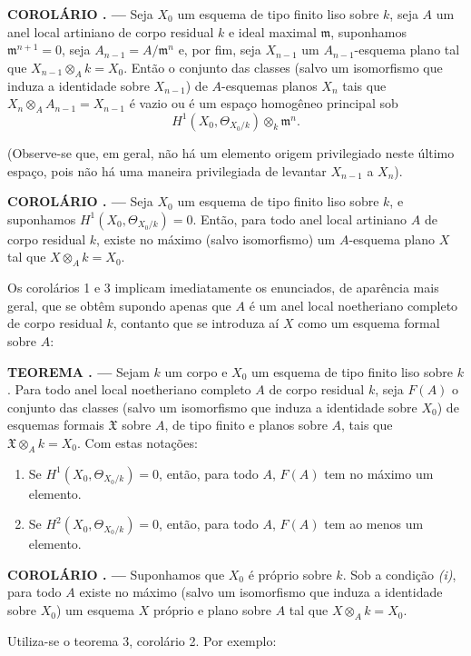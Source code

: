 \documentclass[11pt,twoside,openany]{book}
\numberwithin{equation}{section}
\newcommand{\src}[1]{%
  \phantomsection\hypertarget{src:#1}{}%
  \marginpar{\raggedleft\footnotesize\sffamily #1}%
}
\theoremstyle{plain}
\theoremstyle{definition}
\theoremstyle{remark}
\newcommand{\result}[2]{%
  \par\medskip\noindent\textbf{#1%
  \if\relax\detokenize{#2}\relax\else\space#2\fi. ---}\enspace
}
\newcommand{\FgaUnitKey}{frontmatter}
\renewcommand{\src}[1]{%
  \phantomsection\hypertarget{src:\FgaUnitKey:#1}{}%
  \marginpar{\raggedleft\footnotesize\sffamily #1}%
}
\begin{document}
\src{205}
\result{COROLÁRIO}{2} Seja $X_0$ um esquema de tipo finito liso sobre $k$, seja
$A$ um anel local artiniano de corpo residual $k$ e ideal maximal
$\mathfrak m$, suponhamos $\mathfrak m^{n+1}=0$, seja
$A_{n-1}=A/\mathfrak m^n$ e, por fim, seja $X_{n-1}$ um
$A_{n-1}$-esquema plano tal que $X_{n-1}\otimes_A k=X_0$. Então o conjunto
das classes (salvo um isomorfismo que induza a identidade sobre $X_{n-1}$)
de $A$-esquemas planos $X_n$ tais que
$X_n\otimes_A A_{n-1}=X_{n-1}$ é vazio ou é um espaço homogêneo principal
sob
\[
  H^1(X_0,\Theta_{X_0/k})\otimes_k\mathfrak m^n.
\]

(Observe-se que, em geral, não há um elemento origem privilegiado neste
último espaço, pois não há uma maneira privilegiada de levantar $X_{n-1}$ a
$X_n$).

\result{COROLÁRIO}{3} Seja $X_0$ um esquema de tipo finito liso sobre $k$, e
suponhamos $H^1(X_0,\Theta_{X_0/k})=0$. Então, para todo anel local
artiniano $A$ de corpo residual $k$, existe no máximo (salvo isomorfismo) um
$A$-esquema plano $X$ tal que $X\otimes_A k=X_0$.

Os corolários 1 e 3 implicam imediatamente os enunciados, de aparência mais
geral, que se obtêm supondo apenas que $A$ é um anel local
noetheriano completo de corpo residual $k$, contanto que se introduza aí $X$
como um esquema formal sobre $A$:

\result{TEOREMA}{9} Sejam $k$ um corpo e $X_0$ um esquema de tipo finito liso
sobre $k$. Para todo anel local noetheriano completo $A$ de corpo residual
$k$, seja $F(A)$ o conjunto das classes (salvo um isomorfismo que induza a
identidade sobre $X_0$) de esquemas formais $\mathfrak X$ sobre $A$, de tipo
finito e planos sobre $A$, tais que $\mathfrak X\otimes_A k=X_0$. Com estas
notações:
\begin{enumerate}
  \item[\textit{i.}] Se $H^1(X_0,\Theta_{X_0/k})=0$, então, para todo $A$,
    $F(A)$ tem no máximo um elemento.
  \item[\textit{ii.}] Se $H^2(X_0,\Theta_{X_0/k})=0$, então, para todo $A$,
    $F(A)$ tem ao menos um elemento.
\end{enumerate}

\src{206}
\result{COROLÁRIO}{1} Suponhamos que $X_0$ é próprio sobre $k$. Sob a
condição \textit{(i)}, para todo $A$ existe no máximo (salvo um isomorfismo que
induza a identidade sobre $X_0$) um esquema $X$ próprio e plano sobre $A$ tal
que $X\otimes_A k=X_0$.

Utiliza-se o teorema 3, corolário 2. Por exemplo:
\end{document}
